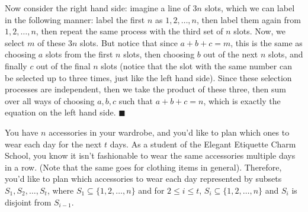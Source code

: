 \documentclass[11pt]{article}
\begin{document}
\begin{Parts}
\begin{solution}
  Now consider the right hand side: imagine a line of $3n$ slots, which we can label in the following manner: label the first $n$ as $1, 2, \dots, n$, then label them again from $1, 2, \dots, n$, then repeat the same process with the third set of $n$ slots. Now, we select $m$ of these $3n$ slots. But notice that since $a + b + c = m$, this is the same as choosing $a$ slots from the first $n$ slots, then choosing $b$ out of the next $n$ slots, and finally $c$ out of the final $n$ slots (notice that the slot with the same number can be selected up to three times, just like the left hand side). Since these selection processes are independent, then we take the product of these three, then sum over all ways of choosing $a, b, c$ such that $a+b+c = n$, which is exactly the equation on the left hand side. $\blacksquare$
\end{solution}
\end{Parts}


You have $n$ accessories in your wardrobe, and you'd like to plan which ones to wear each day for the next $t$ days. As a student of the Elegant Etiquette Charm School, you know it isn't fashionable to wear the same accessories multiple days in a row. (Note that the same goes for clothing items in general).
Therefore, you'd like to plan which accessories to wear each day represented by subsets $S_1,S_2,\ldots,S_t$, where $S_1 \subseteq \{1,2,\ldots,n\}$ and for $2\leq i \leq t$, $S_i \subseteq\{1,2,\ldots,n\}$ and $S_i$ is disjoint from $S_{i-1}$. 
\end{document}
